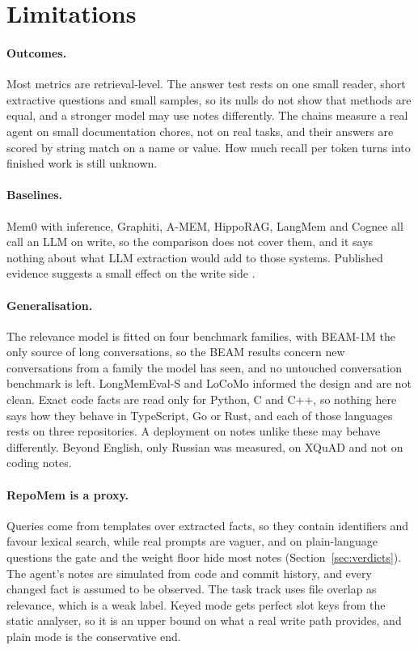 \section{Limitations}\label{sec:limitations}

\paragraph{Outcomes.} Most metrics are retrieval-level. The answer test rests on one small reader, short extractive questions and small samples, so its nulls do not show that methods are equal, and a stronger model may use notes differently. The chains measure a real agent on small documentation chores, not on real tasks, and their answers are scored by string match on a name or value. How much recall per token turns into finished work is still unknown.

\paragraph{Baselines.} Mem0 with inference, Graphiti, A-MEM, HippoRAG, LangMem and Cognee all call an LLM on write, so the comparison does not cover them, and it says nothing about what LLM extraction would add to those systems. Published evidence suggests a small effect on the write side \cite{yuan2026diagnosing}.

\paragraph{Generalisation.} The relevance model is fitted on four benchmark families, with BEAM-1M the only source of long conversations, so the BEAM results concern new conversations from a family the model has seen, and no untouched conversation benchmark is left. LongMemEval-S and LoCoMo informed the design and are not clean. Exact code facts are read only for Python, C and C++, so nothing here says how they behave in TypeScript, Go or Rust, and each of those languages rests on three repositories. A deployment on notes unlike these may behave differently. Beyond English, only Russian was measured, on XQuAD and not on coding notes.

\paragraph{RepoMem is a proxy.} Queries come from templates over extracted facts, so they contain identifiers and favour lexical search, while real prompts are vaguer, and on plain-language questions the gate and the weight floor hide most notes (Section~\ref{sec:verdicts}). The agent's notes are simulated from code and commit history, and every changed fact is assumed to be observed. The task track uses file overlap as relevance, which is a weak label. Keyed mode gets perfect slot keys from the static analyser, so it is an upper bound on what a real write path provides, and plain mode is the conservative end.

